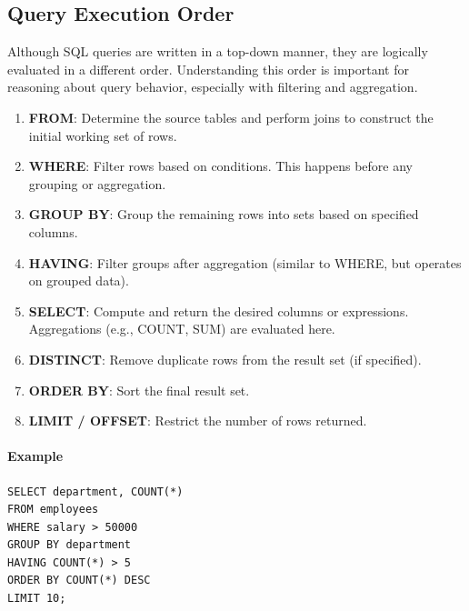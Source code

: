 \documentclass[10pt]{article}
\begin{document}
\newpage 

\subsection{Query Execution Order}

Although SQL queries are written in a top-down manner, they are logically evaluated in a different order. Understanding this order is important for reasoning about query behavior, especially with filtering and aggregation.

\begin{enumerate}
\item \textbf{FROM}: Determine the source tables and perform joins to construct the initial working set of rows.

\item \textbf{WHERE}: Filter rows based on conditions. This happens before any grouping or aggregation.

\item \textbf{GROUP BY}: Group the remaining rows into sets based on specified columns.

\item \textbf{HAVING}: Filter groups after aggregation (similar to WHERE, but operates on grouped data).

\item \textbf{SELECT}: Compute and return the desired columns or expressions. Aggregations (e.g., COUNT, SUM) are evaluated here.

\item \textbf{DISTINCT}: Remove duplicate rows from the result set (if specified).

\item \textbf{ORDER BY}: Sort the final result set.

\item \textbf{LIMIT / OFFSET}: Restrict the number of rows returned.
\end{enumerate}

\paragraph{Example}
\begin{verbatim}
SELECT department, COUNT(*)
FROM employees
WHERE salary > 50000
GROUP BY department
HAVING COUNT(*) > 5
ORDER BY COUNT(*) DESC
LIMIT 10;
\end{verbatim}
\end{document}
